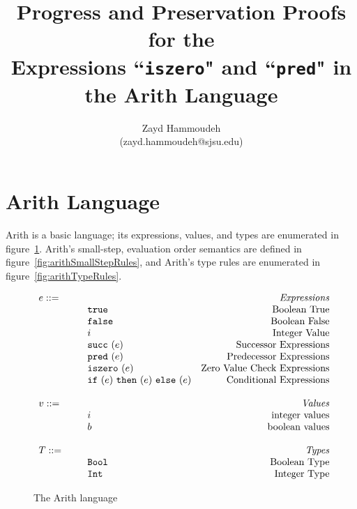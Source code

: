 \documentclass{report}
\title{Progress and Preservation Proofs for the \\
Expressions ``\texttt{iszero}" and ``\texttt{pred}" in the Arith Language}
\author{
  Zayd Hammoudeh \\
  (zayd.hammoudeh@sjsu.edu)
  }
\begin{document}
\maketitle


\tableofcontents{\protect\newpage}

\listoffigures
\newpage
 

\renewcommand\thesection{\arabic{section}}

\section{Arith Language}\label{sec:jvm}

Arith is a basic language; its expressions, values, and types are enumerated in figure~\ref{fig:arithLanguage}.  Arith's small-step, evaluation order semantics are defined in figure~\ref{fig:arithSmallStepRules}, and Arith's type rules are enumerated in figure~\ref{fig:arithTypeRules}.

\newcommand{\mydefhead}[2]{\multicolumn{2}{l}{{#1}}&\mbox{\emph{#2}}\\}
\newcommand{\mydefcase}[2]{\qquad\qquad& #1 &\mbox{#2}\\}

\newcommand{\assign}[2]{#1~{:=}~#2}
\newcommand{\ife}[3]{\mbox{\tt if}~({#1})~\mbox{\tt then}~({#2})~\mbox{\tt else}~({#3})}
\newcommand{\iszeroe}[1]{\mbox{\tt iszero}~(#1)}
\newcommand{\prede}[1]{\mbox{\tt pred}~(#1)}
\newcommand{\succe}[1]{\mbox{\tt succ}~(#1)}
\newcommand{\true}{\mbox{\tt true}}
\newcommand{\false}{\mbox{\tt false}}
\newcommand{\zero}{\mbox{\tt 0}}
\newcommand{\boolt}{\mbox{\tt Bool}}
\newcommand{\intt}{\mbox{\tt Int}}

\begin{figure}[ht!]
\[
\begin{array}{llr}
  \mydefhead{e ::=\qquad\qquad\qquad\qquad}{Expressions}
  \mydefcase{\true}{Boolean True}
  \mydefcase{\false}{Boolean False}
  \mydefcase{i}{Integer Value}
  \mydefcase{\succe e}{Successor Expressions}
  \mydefcase{\prede e}{Predecessor Expressions}
  \mydefcase{\iszeroe e}{Zero Value Check Expressions}
  \mydefcase{\ife e e e}{Conditional Expressions}
  \\
  \mydefhead{v ::=\qquad\qquad\qquad\qquad}{Values}
  \mydefcase{i}{integer values}
  \mydefcase{b}{boolean values}
  \\
  \mydefhead{T ::=\qquad\qquad\qquad\qquad}{Types}
  \mydefcase{\boolt}{Boolean Type}
  \mydefcase{\intt}{Integer Type}
\end{array}
\]
\caption{The Arith language}\label{fig:arithLanguage}
\end{figure}
\end{document}
